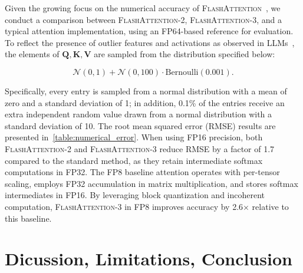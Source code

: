 Given the growing focus on the numerical accuracy of \textsc{FlashAttention}~\citep{golden2024flash}, we conduct a comparison between \textsc{FlashAttention-2}, \textsc{FlashAttention-3}, and a typical attention implementation, using an FP64-based reference for evaluation. To reflect the presence of outlier features and activations as observed in LLMs~\citep{dettmers2208llm, sun2024massive}, the elements of $\mathbf{Q}, \mathbf{K}, \mathbf{V}$ are sampled from the distribution specified below:

\begin{equation*}
  \mathcal{N}(0, 1) + \mathcal{N}(0, 100) \cdot \mathrm{Bernoulli}(0.001).
\end{equation*}

Specifically, every entry is sampled from a normal distribution with a mean of zero and a standard deviation of 1; in addition, 0.1\% of the entries receive an extra independent random value drawn from a normal distribution with a standard deviation of 10. The root mean squared error (RMSE) results are presented in~\cref{table:numerical_error}. When using FP16 precision, both \textsc{FlashAttention-2} and \textsc{FlashAttention-3} reduce RMSE by a factor of 1.7 compared to the standard method, as they retain intermediate softmax computations in FP32. The FP8 baseline attention operates with per-tensor scaling, employs FP32 accumulation in matrix multiplication, and stores softmax intermediates in FP16. By leveraging block quantization and incoherent computation, \textsc{FlashAttention-3} in FP8 improves accuracy by 2.6$\times$ relative to this baseline.

\section{Dicussion, Limitations, Conclusion}
\label{sec:discussion}


